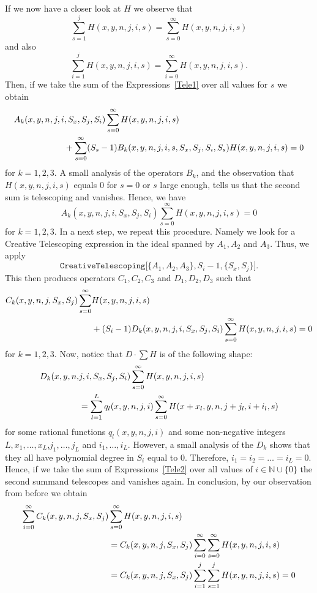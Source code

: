 \documentclass{amsart}
\numberwithin{equation}{section}
\newcommand*{\N}{\mathbb{N}}
\begin{document}
If we now have a closer look at $H$ we observe that
\[\sum_{s=1}^jH(x,y,n,j,i,s)=\sum_{s=0}^\infty H(x,y,n,j,i,s)\]
and also
\[\sum_{i=1}^jH(x,y,n,j,i,s)=\sum_{i=0}^\infty H(x,y,n,j,i,s).\]
Then, if we take the sum of the Expressions~\eqref{Tele1} over all values for $s$ we obtain
\begin{align}
    A_k(x,y,n,j,i&,S_x,S_j,S_i)\sum_{s=0}^\infty H(x,y,n,j,i,s)\notag\\
    &{}+\sum_{s=0}^\infty(S_s-1)B_k(x,y,n,j,i,s,S_x,S_j,S_i,S_s)H(x,y,n,j,i,s)=0 \notag
\end{align}
for $k=1,2,3$. A small analysis of the operators $B_k$, and the observation that \break $H(x,y,n,j,i,s)$ equals $0$ for $s=0$ or $s$ large enough, tells us that the second sum is telescoping and vanishes. Hence, we have
\[A_k(x,y,n,j,i,S_x,S_j,S_i)\sum_{s=0}^\infty H(x,y,n,j,i,s)=0\]
for $k=1,2,3$. In a next step, we repeat this procedure. Namely we look for a Creative Telescoping expression in the ideal spanned by $A_1, A_2$ and $A_3$. Thus, we apply
\[\texttt{CreativeTelescoping[}\{A_1,A_2,A_3\},S_i-1,\{S_x,S_j\}\texttt{]}.\]
This then produces operators $C_1,C_2,C_3$ and $D_1,D_2,D_3$ such that
\begin{align}
    C_k(x,y,n,j,S_x,S_j)\sum_{s=0}^\infty &H(x,y,n,j,i,s)\notag\\
    &+(S_i-1)D_k(x,y,n,j,i,S_x,S_j,S_i)\sum_{s=0}^\infty H(x,y,n,j,i,s)=0 \label{Tele2}
\end{align}
for $k=1,2,3$. Now, notice that $D\cdot \sum H$ is of the following shape:
\begin{align}
    D_k(x,y,n,&j,i,S_x,S_j,S_i)\sum_{s=0}^\infty H(x,y,n,j,i,s)\notag\\
    &=\sum_{l=1}^Lq_l(x,y,n,j,i)\sum_{s=0}^\infty H(x+x_l,y,n,j+j_l,i+i_l,s)\notag
\end{align}
for some rational functions $q_l(x,y,n,j,i)$ and some non-negative integers $L, x_1,\dots, x_L$,\break $j_1,\dots,j_L$ and $i_1,\dots,i_L$. However, a small analysis of the $D_k$ shows that they all have polynomial degree in $S_i$ equal to $0$. Therefore, $i_1=i_2=\dots=i_L=0$. Hence, if we take the sum of Expressions~\eqref{Tele2} over all values of $i\in\N\cup\{0\}$ the second summand telescopes and vanishes again. In conclusion, by our observation from before we obtain 
\begin{align}
    \sum_{i=0}^\infty C_k(x,y,n,j,S_x,S_j)&\sum_{s=0}^\infty H(x,y,n,j,i,s)\notag\\
    &=C_k(x,y,n,j,S_x,S_j)\sum_{i=0}^\infty\sum_{s=0}^\infty H(x,y,n,j,i,s)\notag\\
    &=C_k(x,y,n,j,S_x,S_j)\sum_{i=1}^j\sum_{s=1}^j H(x,y,n,j,i,s)=0\notag
\end{align}
\end{document}
